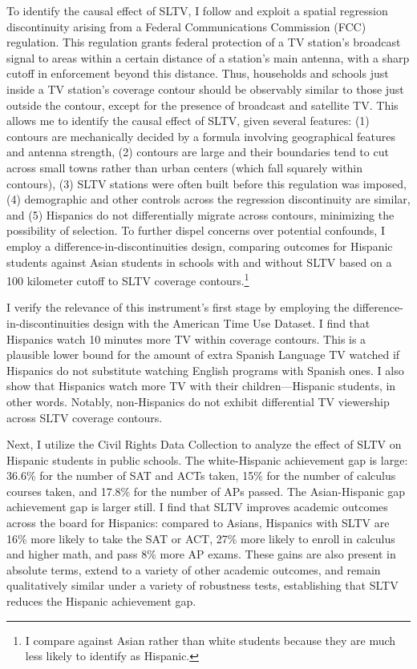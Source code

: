 \documentclass[11pt]{article}
\begin{document}
To identify the causal effect of SLTV, I follow \cite{velez_tuning_2019} and exploit a spatial regression discontinuity arising from a Federal Communications Commission (FCC) regulation. This regulation grants federal protection of a TV station’s broadcast signal to areas within a certain distance of a station’s main antenna, with a sharp cutoff in enforcement beyond this distance. Thus, households and schools just inside a TV station's coverage contour should be observably similar to those just outside the contour, except for the presence of broadcast and satellite TV. This allows me to identify the causal effect of SLTV, given several features: (1) contours are mechanically decided by a formula involving geographical features and antenna strength, (2) contours are large and their boundaries tend to cut across small towns rather than urban centers (which fall squarely within contours), (3) SLTV stations were often built before this regulation was imposed, (4) demographic and other controls across the regression discontinuity are similar, and (5) Hispanics do not differentially migrate across contours, minimizing the possibility of selection. To further dispel concerns over potential confounds, I employ a difference-in-discontinuities design, comparing outcomes for Hispanic students against Asian students in schools with and without SLTV based on a 100 kilometer cutoff to SLTV coverage contours.\footnote{I compare against Asian rather than white students because they are much less likely to identify as Hispanic.} 

I verify the relevance of this instrument's first stage by employing the difference-in-discontinuities design with the American Time Use Dataset. I find that Hispanics watch 10 minutes more TV within coverage contours. This is a plausible lower bound for the amount of extra Spanish Language TV watched if Hispanics do not substitute watching English programs with Spanish ones. I also show that Hispanics watch more TV with their children---Hispanic students, in other words. Notably, non-Hispanics do not exhibit differential TV viewership across SLTV coverage contours.
	
Next, I utilize the Civil Rights Data Collection to analyze the effect of SLTV on Hispanic students in public schools. The white-Hispanic achievement gap is large: 36.6\% for the number of SAT and ACTs taken, 15\% for the number of calculus courses taken, and 17.8\% for the number of APs passed. The Asian-Hispanic gap achievement gap is larger still. I find that SLTV improves academic outcomes across the board for Hispanics: compared to Asians, Hispanics with SLTV are 16\% more likely to take the SAT or ACT, 27\% more likely to enroll in calculus and higher math, and pass 8\% more AP exams. These gains are also present in absolute terms, extend to a variety of other academic outcomes, and remain qualitatively similar under a variety of robustness tests, establishing that SLTV reduces the Hispanic achievement gap. 
\end{document}
